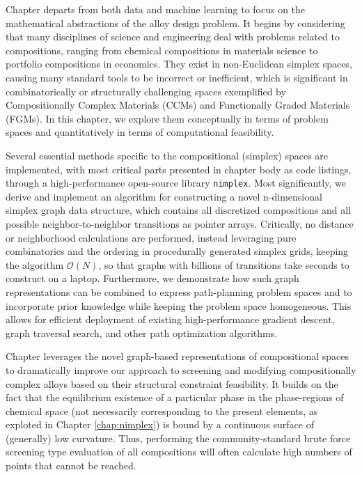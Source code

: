 Chapter  departs from both data and machine learning to focus on the mathematical abstractions of the alloy design problem. It begins by considering that many disciplines of science and engineering deal with problems related to compositions, ranging from chemical compositions in materials science to portfolio compositions in economics. They exist in non-Euclidean simplex spaces, causing many standard tools to be incorrect or inefficient, which is significant in combinatorically or structurally challenging spaces exemplified by Compositionally Complex Materials (CCMs) and Functionally Graded Materials (FGMs). In this chapter, we explore them conceptually in terms of problem spaces and quantitatively in terms of computational feasibility.

Several essential methods specific to the compositional (simplex) spaces are implemented, with most critical parts presented in chapter body as code listings, through a high-performance open-source library \texttt{nimplex}. Most significantly, we derive and implement an algorithm for constructing a novel n-dimensional simplex graph data structure, which contains all discretized compositions and all possible neighbor-to-neighbor transitions as pointer arrays. Critically, no distance or neighborhood calculations are performed, instead leveraging pure combinatorics and the ordering in procedurally generated simplex grids, keeping the algorithm $\mathcal{O}(N)$, so that graphs with billions of transitions take seconds to construct on a laptop. Furthermore, we demonstrate how such graph representations can be combined to express path-planning problem spaces and to incorporate prior knowledge while keeping the problem space homogeneous. This allows for efficient deployment of existing high-performance gradient descent, graph traversal search, and other path optimization algorithms.


Chapter  leverages the novel graph-based representations of compositional spaces to dramatically improve our approach to screening and modifying compositionally complex alloys based on their structural constraint feasibility. It builds on the fact that the equilibrium existence of a particular phase in the phase-regions of chemical space (not necessarily corresponding to the present elements, as exploted in Chapter \ref{chap:nimplex}) is bound by a continuous surface of (generally) low curvature. Thus, performing the community-standard brute force screening type evaluation of all compositions will often calculate high numbers of points that cannot be reached.

